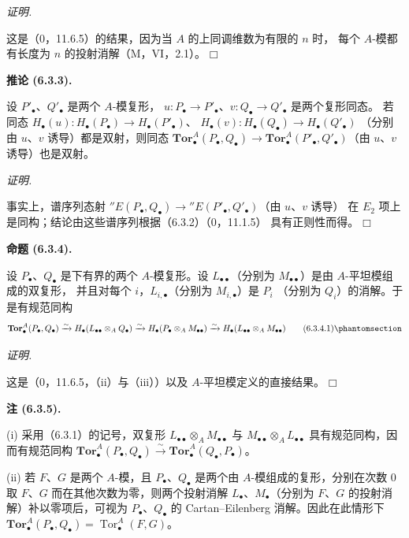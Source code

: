 \documentclass[UTF8,fontset=none,11pt,oneside,openany]{ctexbook}
\providecommand{\square}{\mdlgwhtsquare}
\newenvironment{proposition}[1][]{%
  \par\medskip\noindent\textbf{命题 (#1).}\ %
}{\par}
\newenvironment{corollary}[1][]{%
  \par\medskip\noindent\textbf{推论 (#1).}\ %
}{\par}
\newenvironment{proof}{%
  \par\smallskip\noindent\textit{证明.}\ %
}{\hfill$\square$\par}
\let\EGAOriginalLabel\label
\renewcommand{\label}[1]{\phantomsection\EGAOriginalLabel{#1}}
\newenvironment{namedtheorem}[2][]{%
  \par\medskip\noindent\textbf{#2 (#1).}\ %
}{\par}
\begin{document}
\begin{proof}
这是（0，11.6.5）的结果，因为当 $A$ 的上同调维数为有限的 $n$ 时，
每个 $A$-模都有长度为 $n$ 的投射消解（M，VI，2.1）。
\end{proof}

\begin{corollary}[6.3.3]
设 $P'_\bullet$、$Q'_\bullet$ 是两个 $A$-模复形，
$u:P_\bullet\to P'_\bullet$、$v:Q_\bullet\to Q'_\bullet$ 是两个复形同态。
若同态
$H_\bullet(u):H_\bullet(P_\bullet)\to H_\bullet(P'_\bullet)$、
$H_\bullet(v):H_\bullet(Q_\bullet)\to H_\bullet(Q'_\bullet)$
（分别由 $u$、$v$ 诱导）都是双射，则同态
$\mathbf{Tor}_\bullet^A(P_\bullet,Q_\bullet)\to
\mathbf{Tor}_\bullet^A(P'_\bullet,Q'_\bullet)$（由 $u$、$v$ 诱导）也是双射。
\end{corollary}

\begin{proof}
事实上，谱序列态射
$''E(P_\bullet,Q_\bullet)\to''E(P'_\bullet,Q'_\bullet)$（由 $u$、$v$ 诱导）
在 $E_2$ 项上是同构；结论由这些谱序列根据（6.3.2）（0，11.1.5）
具有正则性而得。
\end{proof}

\begin{proposition}[6.3.4]
设 $P_\bullet$、$Q_\bullet$ 是下有界的两个 $A$-模复形。设
$L_{\bullet\bullet}$（分别为 $M_{\bullet\bullet}$）是由 $A$-平坦模组成的双复形，
并且对每个 $i$，$L_{i,\bullet}$（分别为 $M_{i,\bullet}$）是 $P_i$
（分别为 $Q_i$）的消解。于是有规范同构
\[
  \mathbf{Tor}_\bullet^A(P_\bullet,Q_\bullet)
  \xrightarrow{\sim}H_\bullet(L_{\bullet\bullet}\otimes_AQ_\bullet)
  \xrightarrow{\sim}H_\bullet(P_\bullet\otimes_AM_{\bullet\bullet})
  \xrightarrow{\sim}H_\bullet(L_{\bullet\bullet}\otimes_AM_{\bullet\bullet})
  \tag{6.3.4.1}\label{III.6.3.4.1-fr}
\]
\end{proposition}

\begin{proof}
这是（0，11.6.5，（ii）与（iii））以及 $A$-平坦模定义的直接结果。
\end{proof}

\begin{namedtheorem}[6.3.5]{注}
(i) 采用（6.3.1）的记号，双复形
$L_{\bullet\bullet}\otimes_A M_{\bullet\bullet}$ 与
$M_{\bullet\bullet}\otimes_A L_{\bullet\bullet}$ 具有规范同构，因而有规范同构
$\mathbf{Tor}_\bullet^A(P_\bullet,Q_\bullet)\xrightarrow{\sim}
\mathbf{Tor}_\bullet^A(Q_\bullet,P_\bullet)$。

(ii) 若 $F$、$G$ 是两个 $A$-模，且 $P_\bullet$、$Q_\bullet$ 是两个由
$A$-模组成的复形，分别在次数 0 取 $F$、$G$ 而在其他次数为零，则两个投射消解
$L_\bullet$、$M_\bullet$（分别为 $F$、$G$ 的投射消解）补以零项后，可视为
$P_\bullet$、$Q_\bullet$ 的
Cartan--Eilenberg 消解。因此在此情形下
$\mathbf{Tor}_\bullet^A(P_\bullet,Q_\bullet)
=\operatorname{Tor}_\bullet^A(F,G)$。
\end{namedtheorem}
\end{document}
